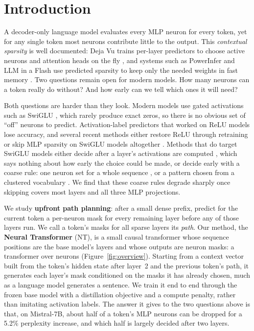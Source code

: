 \documentclass[10pt,twocolumn,letterpaper]{article}
\begin{document}
\section{Introduction}

A decoder-only language model evaluates every MLP neuron for every token, yet for any single token most neurons contribute little to the output. This \emph{contextual sparsity} is well documented: Deja Vu trains per-layer predictors to choose active neurons and attention heads on the fly \citep{liu2023dejavu}, and systems such as PowerInfer and LLM in a Flash use predicted sparsity to keep only the needed weights in fast memory \citep{song2024powerinfer,alizadeh2024flash}. Two questions remain open for modern models. How many neurons can a token really do without? And how early can we tell which ones it will need?

Both questions are harder than they look. Modern models use gated activations such as SwiGLU \citep{shazeer2020glu}, which rarely produce exact zeros, so there is no obvious set of ``off'' neurons to predict. Activation-label predictors that worked on ReLU models lose accuracy, and several recent methods either restore ReLU through retraining \citep{mirzadeh2023relu,song2025prosparse} or skip MLP sparsity on SwiGLU models altogether \citep{shrestha2025polar}. Methods that do target SwiGLU models either decide after a layer's activations are computed \citep{lee2024cats,liu2025teal}, which says nothing about how early the choice could be made, or decide early with a coarse rule: one neuron set for a whole sequence \citep{dong2024griffin}, or a pattern chosen from a clustered vocabulary \citep{dhar2026neuroprefetcher}. We find that these coarse rules degrade sharply once skipping covers most layers and all three MLP projections.

We study \textbf{upfront path planning}: after a small dense prefix, predict for the current token a per-neuron mask for every remaining layer before any of those layers run. We call a token's masks for all sparse layers its \emph{path}. Our method, the \textbf{Neural Transformer} (NT), is a small causal transformer whose sequence positions are the base model's layers and whose outputs are neuron masks: a transformer over neurons (Figure~\ref{fig:overview}). Starting from a context vector built from the token's hidden state after layer~2 and the previous token's path, it generates each layer's mask conditioned on the masks it has already chosen, much as a language model generates a sentence. We train it end to end through the frozen base model with a distillation objective and a compute penalty, rather than imitating activation labels. The answer it gives to the two questions above is that, on Mistral-7B, about half of a token's MLP neurons can be dropped for a 5.2\% perplexity increase, and which half is largely decided after two layers.
\end{document}
